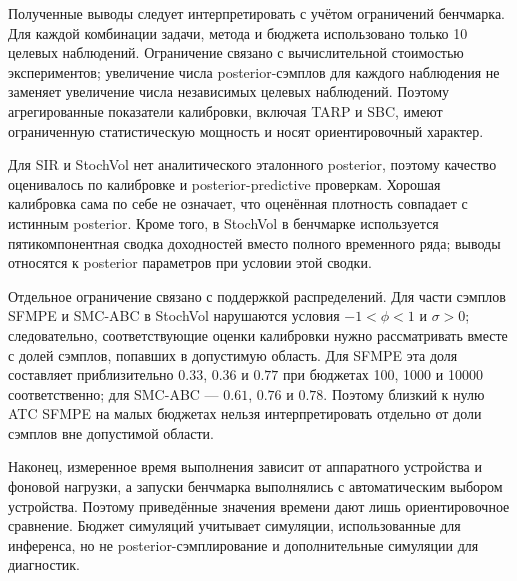 Полученные выводы следует интерпретировать с учётом ограничений
бенчмарка. Для каждой комбинации задачи, метода и бюджета использовано
только 10 целевых наблюдений. Ограничение связано с вычислительной
стоимостью экспериментов; увеличение числа posterior-сэмплов для каждого
наблюдения не заменяет увеличение числа независимых целевых наблюдений.
Поэтому агрегированные показатели калибровки, включая TARP и SBC, имеют
ограниченную статистическую мощность и носят ориентировочный характер.

Для SIR и StochVol нет аналитического эталонного posterior, поэтому
качество оценивалось по калибровке и posterior-predictive проверкам.
Хорошая калибровка сама по себе не означает, что оценённая плотность
совпадает с истинным posterior. Кроме того, в StochVol в бенчмарке
используется пятикомпонентная сводка доходностей вместо полного временного
ряда; выводы относятся к posterior параметров при условии этой сводки.

Отдельное ограничение связано с поддержкой распределений. Для части
сэмплов SFMPE и SMC-ABC в StochVol нарушаются условия $-1<\phi<1$ и
$\sigma>0$; следовательно, соответствующие оценки калибровки нужно
рассматривать вместе с долей сэмплов, попавших в допустимую область.
Для SFMPE эта доля составляет приблизительно $0.33$, $0.36$ и $0.77$
при бюджетах 100, 1000 и 10000 соответственно; для SMC-ABC --- $0.61$,
$0.76$ и $0.78$. Поэтому близкий к нулю ATC SFMPE на малых бюджетах
нельзя интерпретировать отдельно от доли сэмплов вне допустимой области.

Наконец, измеренное время выполнения зависит от аппаратного устройства
и фоновой нагрузки, а запуски бенчмарка выполнялись с автоматическим
выбором устройства. Поэтому приведённые значения времени дают лишь
ориентировочное сравнение. Бюджет симуляций учитывает симуляции,
использованные для инференса, но не posterior-сэмплирование и
дополнительные симуляции для диагностик.